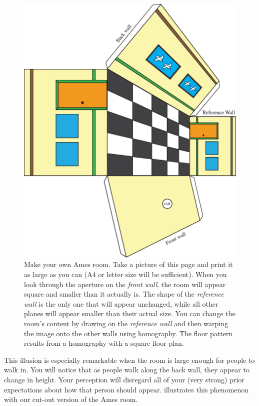 \begin{figure}[t]
\centerline{
\includegraphics[width=.8\linewidth]{figures/single_view_3d/ames_room.eps}
}
\caption{Make your own Ames room. Take a picture of this page and print it as large as you can (A4 or letter size will be sufficient). When you look through the aperture on the {\em front wall}, the room will appear square and smaller than it actually is. The shape of the {\em reference wall} is the only one that will appear unchanged, while all other planes will appear smaller than their actual size. You can change the room's content by drawing on the {\em reference wall} and then warping the image onto the other walls using homography. The floor pattern results from a homography with a square floor plan.}
\label{fig:ames_room}
\end{figure}


This illusion is especially remarkable when the room is large enough for people to walk in. You will notice that as people walk along the back wall, they appear to change in height. Your perception will disregard all of your (very strong) prior expectations about how that person should appear. \Fig{\ref{fig:ames_room_cat}} illustrates this phenomenon with our cut-out version of the Ames room.

